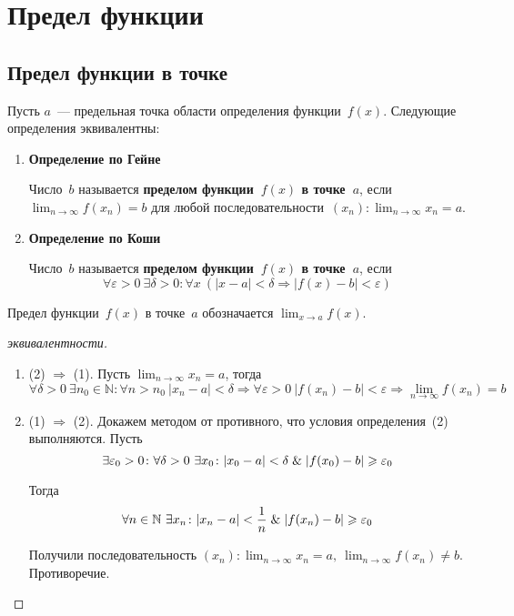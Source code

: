 \section{Предел функции}
\subsection{Предел функции в точке}
 

Пусть $a$~--- предельная точка области определения функции~$f(x)$.
Следующие определения эквивалентны:
\begin{enumerate}
	\item \textbf{Определение по Гейне}
	
	Число~$b$ называется \textbf{пределом функции~$f(x)$ в точке~$a$}, если $\displaystyle \lim_{n \to \infty} f(x_n) = b$ для любой последовательности~$\displaystyle (x_n): \lim_{n \to \infty} x_n = a$.
	
	\item \textbf{Определение по Коши}
	
	Число~$b$ называется \textbf{пределом функции~$f(x)$ в точке~$a$}, если
	\begin{equation*}
	\forall \varepsilon > 0 \ \exists \delta > 0 \colon \forall x \ (|x - a| < \delta \Rightarrow |f(x) - b| < \varepsilon)
	\end{equation*}
\end{enumerate}

Предел функции~$f(x)$ в точке~$a$ обозначается $\displaystyle \lim_{x \to a} f(x)$.
\begin{proof}[эквивалентности]
\begin{enumerate}
	\item (2) $\Rightarrow$ (1).
	Пусть $\displaystyle \lim_{n \to \infty} x_n = a$, тогда
	\begin{equation*}
	\forall \delta > 0 \ \exists n_0 \in \mathbb N \colon \forall n > n_0 \ |x_n - a| < \delta \Rightarrow
	\forall \varepsilon > 0 \ |f(x_n) - b| < \varepsilon \Rightarrow
	\lim_{n \to \infty} f(x_n) = b
	\end{equation*}
	
	\item (1) $\Rightarrow$ (2).
	Докажем методом от противного, что условия определения~(2) выполняются.
	Пусть
	\begin{equation*}
	\exists \varepsilon_0 > 0 \colon \forall \delta > 0 \ \exists x_0 \colon |x_0 - a| < \delta \mathrel{\&} |f(x_0) - b| \geqslant \varepsilon_0
	\end{equation*}
	
	Тогда
	\begin{equation*}
	\forall n \in \mathbb N \ \exists x_n \colon |x_n - a| < \frac1n \mathrel{\&} |f(x_n) - b| \geqslant \varepsilon_0
	\end{equation*}
	
	Получили последовательность $\displaystyle (x_n) \colon \lim_{n \to \infty} x_n = a, \ \lim_{n \to \infty} f(x_n) \neq b$.
	Противоречие.
\end{enumerate}
\end{proof}

